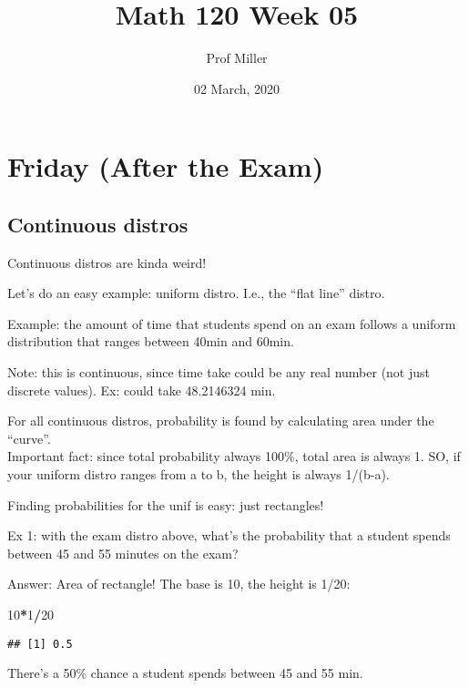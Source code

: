 \documentclass[]{article}
\title{Math 120 Week 05}
\author{Prof Miller}
\date{02 March, 2020}
\newenvironment{Shaded}{\begin{snugshade}}{\end{snugshade}}
\newcommand{\DecValTok}[1]{\textcolor[rgb]{0.00,0.00,0.81}{#1}}
\newcommand{\OperatorTok}[1]{\textcolor[rgb]{0.81,0.36,0.00}{\textbf{#1}}}
\begin{document}
\maketitle

{
\setcounter{tocdepth}{3}
\tableofcontents
}
\hypertarget{friday-after-the-exam}{%
\section{Friday (After the Exam)}\label{friday-after-the-exam}}

\hypertarget{continuous-distros}{%
\subsection{Continuous distros}\label{continuous-distros}}

Continuous distros are kinda weird!

Let's do an easy example: uniform distro. I.e., the ``flat line''
distro.

Example: the amount of time that students spend on an exam follows a
uniform distribution that ranges between 40min and 60min.

Note: this is continuous, since time take could be any real number (not
just discrete values). Ex: could take 48.2146324 min.

For all continuous distros, probability is found by calculating area
under the ``curve''.\\
Important fact: since total probability always 100\%, total area is
always 1. SO, if your uniform distro ranges from a to b, the height is
always 1/(b-a).

Finding probabilities for the unif is easy: just rectangles!

Ex 1: with the exam distro above, what's the probability that a student
spends between 45 and 55 minutes on the exam?

Answer: Area of rectangle! The base is 10, the height is 1/20:

\begin{Shaded}
\begin{Highlighting}[]
\DecValTok{10}\OperatorTok{*}\DecValTok{1}\OperatorTok{/}\DecValTok{20}
\end{Highlighting}
\end{Shaded}

\begin{verbatim}
## [1] 0.5
\end{verbatim}

There's a 50\% chance a student spends between 45 and 55 min.
\end{document}
